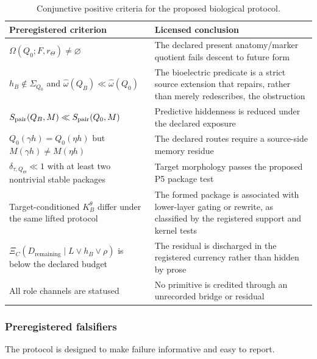 \begin{table}[htbp]
\centering
\small
\begin{tabularx}{\textwidth}{@{}lX@{}}
\toprule
Preregistered criterion & Licensed conclusion \\
\midrule
$\Omega(Q_0;F,r_\Theta)\ne\varnothing$ &
The declared present anatomy/marker quotient fails descent to future form \\
$h_B\notin\Sigma_{Q_0}$ and
$\widehat\omega(Q_B)\ll\widehat\omega(Q_0)$ &
The bioelectric predicate is a strict source extension that repairs, rather
than merely redescribes, the obstruction \\
$S_{\rm pair}(Q_B,M)\ll S_{\rm pair}(Q_0,M)$ &
Predictive hiddenness is reduced under the declared exposure \\
$Q_0(\gamma h)=Q_0(\eta h)$ but
$M(\gamma h)\ne M(\eta h)$ &
The declared routes require a source-side memory residue \\
$\delta_{\tau,Q_\Theta}\ll1$ with at least two nontrivial stable packages &
Target morphology passes the proposed P5 package test \\
Target-conditioned $K_B^\theta$ differ under the same lifted protocol &
The formed package is associated with lower-layer gating or rewrite, as
classified by the registered support and kernel tests \\
$\Xi_C(D_{\mathrm{remaining}}\mid L\vee h_B\vee\rho)$ is below the declared
budget &
The residual is discharged in the registered currency rather than hidden by
prose \\
All role channels are statused &
No primitive is credited through an unrecorded bridge or residual \\
\bottomrule
\end{tabularx}
\caption{Conjunctive positive criteria for the proposed biological
protocol.}
\label{tab:hololife-positive}
\end{table}

\subsubsection{Preregistered falsifiers}

The protocol is designed to make failure informative and easy to report.

